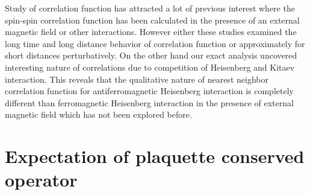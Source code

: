 \documentclass[aps,amsmath,twocolumn,amssymb,floatfix,showpacs,superscriptaddress,nofootinbib,longbibliography]{revtex4-1}
\begin{document}
\indent
   Study of correlation function has attracted a lot of previous interest \cite{tikhonov-2011,song-2016,lunkin-2019,yang-2020,berke-prb-2020} where the spin-spin correlation function has been calculated in the presence of an external magnetic field or other interactions. However either these studies examined the long time and long distance behavior of correlation function \cite{tikhonov-2011,lunkin-2019} or approximately for short distances \cite{yang-2020} perturbatively. On the other hand our exact analysis  uncovered interesting nature of correlations due to competition of Heisenberg and Kitaev interaction. This reveals that the qualitative nature of nearest neighbor correlation function for  antiferromagnetic  Heisenberg interaction  is completely different than ferromagnetic Heisenberg interaction in the presence of external magnetic field which has not been explored before.
\section{Expectation of plaquette conserved operator}
\label{bpoperator}
\end{document}
